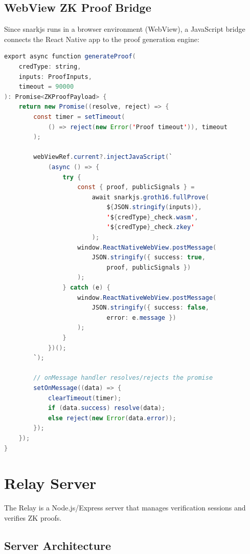 \subsection{WebView ZK Proof Bridge}

Since snarkjs runs in a browser environment (WebView), a JavaScript bridge connects the React Native app to the proof generation engine:

\begin{lstlisting}[language=Java, caption={ZK WebView Bridge (zkbridge.ts)}]
export async function generateProof(
    credType: string,
    inputs: ProofInputs,
    timeout = 90000
): Promise<ZKProofPayload> {
    return new Promise((resolve, reject) => {
        const timer = setTimeout(
            () => reject(new Error('Proof timeout')), timeout
        );
        
        webViewRef.current?.injectJavaScript(`
            (async () => {
                try {
                    const { proof, publicSignals } = 
                        await snarkjs.groth16.fullProve(
                            ${JSON.stringify(inputs)},
                            '${credType}_check.wasm',
                            '${credType}_check.zkey'
                        );
                    window.ReactNativeWebView.postMessage(
                        JSON.stringify({ success: true, 
                            proof, publicSignals })
                    );
                } catch (e) {
                    window.ReactNativeWebView.postMessage(
                        JSON.stringify({ success: false, 
                            error: e.message })
                    );
                }
            })();
        `);
        
        // onMessage handler resolves/rejects the promise
        setOnMessage((data) => {
            clearTimeout(timer);
            if (data.success) resolve(data);
            else reject(new Error(data.error));
        });
    });
}
\end{lstlisting}

\section{Relay Server}

The Relay is a Node.js/Express server that manages verification sessions and verifies ZK proofs.

\subsection{Server Architecture}

